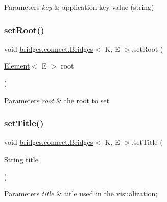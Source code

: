 \begin{DoxyParams}{Parameters}
{\em key} & application key value (string) \\
\hline
\end{DoxyParams}
\hypertarget{classbridges_1_1connect_1_1_bridges_aa05295718a1fefa2917dbaf874c79415}{}\label{classbridges_1_1connect_1_1_bridges_aa05295718a1fefa2917dbaf874c79415} 
\subsubsection{\texorpdfstring{set\+Root()}{setRoot()}}
{\footnotesize\ttfamily void \hyperlink{classbridges_1_1connect_1_1_bridges}{bridges.\+connect.\+Bridges}$<$ K, E $>$.set\+Root (\begin{DoxyParamCaption}\item[{\hyperlink{classbridges_1_1base_1_1_element}{Element}$<$ E $>$}]{root }\end{DoxyParamCaption})}


\begin{DoxyParams}{Parameters}
{\em root} & the root to set \\
\hline
\end{DoxyParams}
\hypertarget{classbridges_1_1connect_1_1_bridges_a90c7f6b2b99d88bf241ea7247db47045}{}\label{classbridges_1_1connect_1_1_bridges_a90c7f6b2b99d88bf241ea7247db47045} 
\subsubsection{\texorpdfstring{set\+Title()}{setTitle()}}
{\footnotesize\ttfamily void \hyperlink{classbridges_1_1connect_1_1_bridges}{bridges.\+connect.\+Bridges}$<$ K, E $>$.set\+Title (\begin{DoxyParamCaption}\item[{String}]{title }\end{DoxyParamCaption})}


\begin{DoxyParams}{Parameters}
{\em title} & title used in the visualization; \\
\hline
\end{DoxyParams}
\hypertarget{classbridges_1_1connect_1_1_bridges_a2d84103645662308e58a1b473d3320ae}{}\label{classbridges_1_1connect_1_1_bridges_a2d84103645662308e58a1b473d3320ae} 
